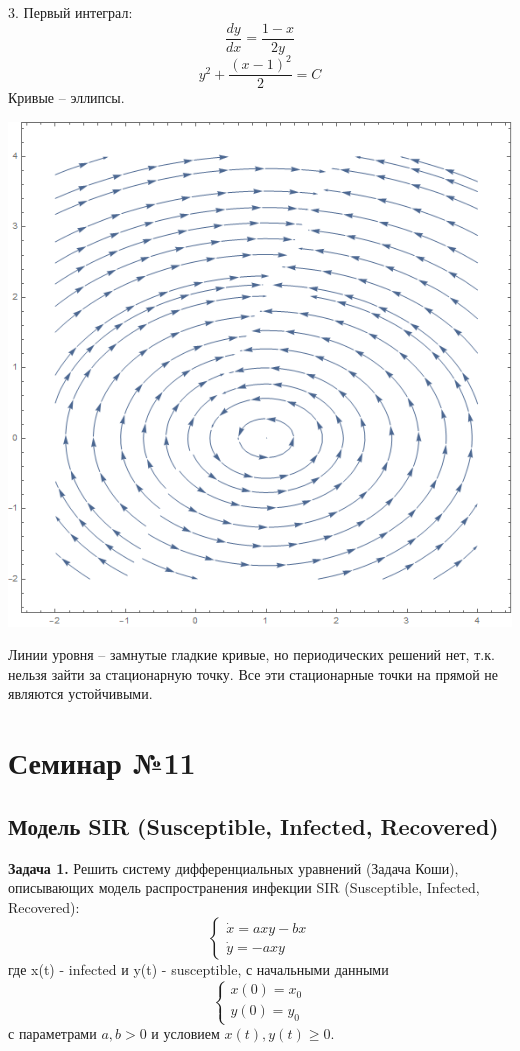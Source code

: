 \documentclass[10pt]{report}
\begin{document}
3. Первый интеграл:
\[\frac {dy} {dx} = \frac {1-x} {2y}\]
\[y^2+ \frac {(x-1)^2} {2} = C\]
Кривые -- эллипсы.
\begin{center}
{\includegraphics[scale=0.48]{graph12.3.png}} 
\end{center}
Линии уровня -- замнутые гладкие кривые, но периодических решений нет, т.к. нельзя зайти за стационарную точку. Все эти стационарные точки на прямой не являются устойчивыми. 

\chapter[{Семинар №11}]{Семинар №11}
\thispagestyle{empty}
\section {Модель SIR (Susceptible, Infected, Recovered)}
\textbf{Задача 1.} Решить систему дифференциальных уравнений (Задача Коши), описывающих модель распространения инфекции SIR (Susceptible, Infected, Recovered):
\begin{equation}
\left\{
\begin{array}{lr}
\dot{x}=axy-bx\\
\dot{y}=-axy
\end{array}
\right.
\end{equation}
где x(t) - infected и y(t) - susceptible, с начальными данными
\begin{equation}
\left\{
\begin{array}{lr}
x(0)=x_0\\
y(0)=y_0
\end{array}
\right.
\end{equation}
с параметрами $a,b>0$ и условием $x(t),y(t) \geq 0$.\\
\end{document}
